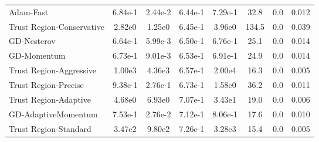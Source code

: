 \documentclass{article}
\begin{document}
\begin{table}[htbp]
{\begin{tabular}{p{2.5cm}*{7}{c}}
Adam-Fast & 6.84e-1 & 2.44e-2 & 6.44e-1 & 7.29e-1 & 32.8 & 0.0 & 0.012 \\
Trust Region-Conservative & 2.82e0 & 1.25e0 & 6.45e-1 & 3.96e0 & 134.5 & 0.0 & 0.039 \\
GD-Nesterov & 6.64e-1 & 5.99e-3 & 6.50e-1 & 6.76e-1 & 25.1 & 0.0 & 0.014 \\
GD-Momentum & 6.73e-1 & 9.01e-3 & 6.53e-1 & 6.91e-1 & 24.9 & 0.0 & 0.014 \\
Trust Region-Aggressive & 1.00e3 & 4.36e3 & 6.57e-1 & 2.00e4 & 16.3 & 0.0 & 0.005 \\
Trust Region-Precise & 9.38e-1 & 2.76e-1 & 6.73e-1 & 1.58e0 & 36.2 & 0.0 & 0.011 \\
Trust Region-Adaptive & 4.68e0 & 6.93e0 & 7.07e-1 & 3.43e1 & 19.0 & 0.0 & 0.006 \\
GD-AdaptiveMomentum & 7.53e-1 & 2.76e-2 & 7.12e-1 & 8.06e-1 & 17.6 & 0.0 & 0.010 \\
Trust Region-Standard & 3.47e2 & 9.80e2 & 7.26e-1 & 3.28e3 & 15.4 & 0.0 & 0.005 \\
\bottomrule
\end{tabular}
}
\end{table}
\end{document}
